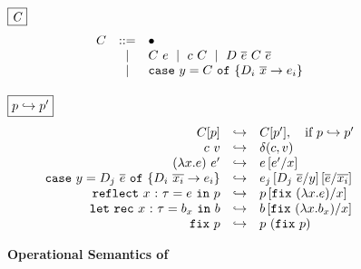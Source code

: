 \begin{figure}[t!]
\centering

\hfill{{$\fbox{\textit{C}}$}}
$$
\begin{array}{rcl}
  C & ::=    & \bullet \\
    & \ \mid \  & C\ e \ \mid \  c\ C \ \mid \  D\ \overline{e}\ C\ \overline{e}\\
    & \ \mid \  &  \mathtt{case}\ y=C\ \mathtt{of}\ \{ D_i\ \overline{x} \rightarrow e_i\} 
  \\[0.03in]
\end{array}
$$

\hfill{{$\fbox{\goesto{\prog}{\prog'}}$}}
$$
\begin{array}{rcl}
C[\prog]
  & \hookrightarrow
  & C[\prog'],\quad \text{if}\ \goesto{\prog}{\prog'}
  \\
{c\ v}
  & \hookrightarrow
  & {\ceval{c}{v}}
  \\
{({\efun{x}{\typ}{e})}\ {e'}}
  & \hookrightarrow
  & {\SUBST{e}{x}{e'}}
  \\
{\ecase{y}{\dc_j\ \overline{e}}{\dc_i}{\overline{x_i}}{e_i}}
  & \hookrightarrow
  & {\SUBST{\SUBST{e_j}{y}{\dc_j\ \overline{e}}}{\overline{x_i}}{\overline{e}}}
  \\
{\erefb{x}{\gtyp}{e}{\prog}}
  & \hookrightarrow
  & {\SUBST{\prog}{x}{\efix{(\efun{x}{\gtyp}{e})}}}
  \\
{\eletb{x}{\gtyp}{\bd_x}{\bd}}
  & \hookrightarrow
  & {\SUBST{\bd}{x}{\efix{(\efun{x}{\gtyp}{\bd_x})}}}
  \\
{\efix{\prog}}
  & \hookrightarrow
  & {\prog\ (\efix{\prog})}
\end{array}
$$
\caption{\textbf{Operational Semantics of \corelan}}
\label{fig:semantics}
\end{figure}
